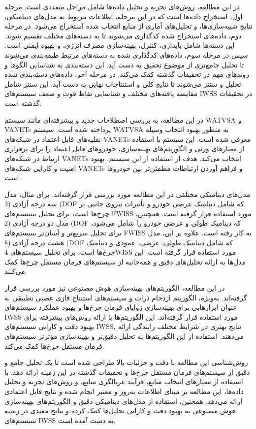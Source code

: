 \documentclass[a4paper,10pt]{article}
\begin{document}
        در این مطالعه، روش‌های تجزیه و تحلیل داده‌ها شامل مراحل متعددی است. مرحله اول، استخراج داده‌ها است که در این مرحله، اطلاعات مربوط به مدل‌های دینامیکی، نتایج شبیه‌سازی‌ها، و تحلیل‌های آماری از منابع انتخاب شده استخراج می‌شود. در مرحله دوم، داده‌های استخراج شده کدگذاری می‌شوند تا به دسته‌های مختلف تقسیم شوند. این دسته‌ها شامل پایداری، کنترل، بهینه‌سازی مصرف انرژی، و بهبود ایمنی است. سپس در مرحله سوم، داده‌های کدگذاری شده به دسته‌های مرتبط طبقه‌بندی می‌شوند تا تحلیل جامع‌تری از موضوع تحقیق به دست آید. این دسته‌بندی به شناسایی الگوها و روندهای مهم در تحقیقات گذشته کمک می‌کند. در مرحله آخر، داده‌های دسته‌بندی شده تحلیل و سنتز می‌شوند تا نتایج کلی و استنتاجات نهایی به دست آید. این سنتز شامل مقایسه یافته‌های مختلف و شناسایی نقاط قوت و ضعف سیستم‌های IWSS در تحقیقات گذشته است.

        در این مطالعه، به بررسی اصطلاحات جدید و پیشرفته‌ای مانند سیستم WATVSA و VANETs پرداخته شده است. سیستم WATVSA به منظور بهبود انتخاب وسیله نقلیه‌های قابل اعتماد در شبکه‌های VANETs معرفی شده است. این سیستم با استفاده از معیارهای وزنی و الگوریتم‌های بهینه‌سازی، خودروهای قابل اعتماد را برای برقراری ارتباط در شبکه‌های VANETs انتخاب می‌کند. هدف از استفاده از این سیستم، بهبود امنیت و کارایی شبکه‌های VANETs و فراهم آوردن ارتباطات مطمئن‌تر بین خودروها است.

        مدل‌های دینامیکی مختلفی در این مطالعه مورد بررسی قرار گرفته‌اند. برای مثال، مدل سه درجه آزادی (3 (DOF که شامل دینامیک عرضی خودرو و تأثیرات نیروی جانبی بر چرخ‌ها است، برای تحلیل سیستم‌های FWISS مورد استفاده قرار گرفته است. همچنین، مدل دو درجه آزادی (2 (DOF که دینامیک طولی و عرضی خودرو را شامل می‌شود، برای تحلیل سریع‌تر و آسان‌تر سیستم‌های FWISS به کار رفته است. علاوه بر این، مدل هشت درجه آزادی (8 (DOF که شامل دینامیک طولی، عرضی، عمودی و دینامیک چرخ‌ها است، برای تحلیل سیستم‌های 4WISS مورد استفاده قرار گرفته است. این مدل‌ها به ارائه تحلیل‌های دقیق و همه‌جانبه از سیستم‌های فرمان مستقل چرخ‌ها کمک می‌کنند.

        در این مطالعه، الگوریتم‌های بهینه‌سازی هوش مصنوعی نیز مورد بررسی قرار گرفته‌اند. به‌ویژه، الگوریتم ازدحام ذرات و سیستم‌های استنتاج فازی عصبی تطبیقی به عنوان ابزارهایی برای بهینه‌سازی زوایای فرمان چرخ‌ها و بهبود عملکرد سیستم‌های IWSS مورد استفاده قرار گرفته‌اند. این الگوریتم‌ها با ارائه روش‌های پیشرفته برای بهبود دقت و کارایی سیستم‌های IWSS، نتایج بهتری در شرایط مختلف رانندگی ارائه می‌دهند. استفاده از این الگوریتم‌ها به تحلیل دقیق‌تر و بهینه‌سازی مؤثرتر سیستم‌های فرمان مستقل چرخ‌ها کمک می‌کند.

        روش‌شناسی این مطالعه با دقت و جزئیات بالا طراحی شده است تا یک تحلیل جامع و دقیق از سیستم‌های فرمان مستقل چرخ‌ها و تحقیقات گذشته در این زمینه ارائه دهد. با استفاده از معیارهای انتخاب منابع، فرآیند غربالگری منابع، و روش‌های تجزیه و تحلیل داده‌ها، این مطالعه بر مبنای اطلاعات به‌روز و معتبر انجام شده و نتایج قابل اعتمادی ارائه می‌دهد. همچنین، استفاده از مدل‌های دینامیکی دقیق و الگوریتم‌های بهینه‌سازی هوش مصنوعی به بهبود دقت و کارایی تحلیل‌ها کمک کرده و نتایج مفیدی در زمینه سیستم‌های IWSS به دست آمده است.
\end{document}
